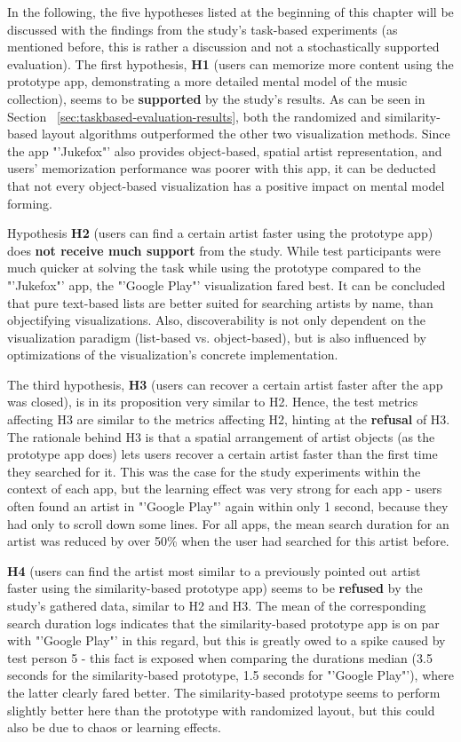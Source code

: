 In the following, the five hypotheses listed at the beginning of this chapter will be discussed with the findings from the study's task-based experiments (as mentioned before, this is rather a discussion and not a stochastically supported evaluation).
The first hypothesis, \textbf{H1} (users can memorize more content using the prototype app, demonstrating a more detailed mental model of the music collection), seems to be \textbf{supported} by the study's results. As can be seen in Section ~\ref{sec:taskbased-evaluation-results}, both the randomized and similarity-based layout algorithms outperformed the other two visualization methods. Since the app "'Jukefox"' also provides object-based, spatial artist representation, and users' memorization performance was poorer with this app, it can be deducted that not every object-based visualization has a positive impact on mental model forming.

Hypothesis \textbf{H2} (users can find a certain artist faster using the prototype app) does \textbf{not receive much support} from the study. While test participants were much quicker at solving the task while using the prototype compared to the "'Jukefox"' app, the "'Google Play"' visualization fared best. It can be concluded that pure text-based lists are better suited for searching artists by name, than objectifying visualizations. Also, discoverability is not only dependent on the visualization paradigm (list-based vs. object-based), but is also influenced by optimizations of the visualization's concrete implementation.
 
The third hypothesis, \textbf{H3} (users can recover a certain artist faster after the app was closed), is in its proposition very similar to H2. Hence, the test metrics affecting H3 are similar to the metrics affecting H2, hinting at the \textbf{refusal} of H3. The rationale behind H3 is that a spatial arrangement of artist objects (as the prototype app does) lets users recover a certain artist faster than the first time they searched for it. This was the case for the study experiments within the context of each app, but the learning effect was very strong for each app - users often found an artist in "'Google Play"' again within only 1 second, because they had only to scroll down some lines. For all apps, the mean search duration for an artist was reduced by over 50\% when the user had searched for this artist before.

\textbf{H4} (users can find the artist most similar to a previously pointed out artist faster using the similarity-based prototype app) seems to be \textbf{refused} by the study's gathered data, similar to H2 and H3. The mean of the corresponding search duration logs indicates that the similarity-based prototype app is on par with "'Google Play"' in this regard, but this is greatly owed to a spike caused by test person 5 - this fact is exposed when comparing the durations median (3.5 seconds for the similarity-based prototype, 1.5 seconds for "'Google Play"'), where the latter clearly fared better. The similarity-based prototype seems to perform slightly better here than the prototype with randomized layout, but this could also be due to chaos or learning effects.

